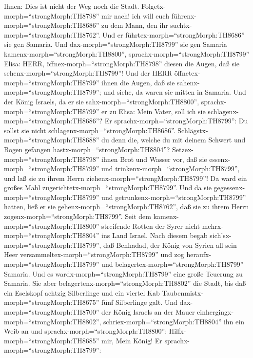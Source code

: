 Ihnen: Dies ist nicht der Weg noch die Stadt.
Folgetx-morph=``strongMorph:TH8798'' mir nach! ich will euch
führenx-morph=``strongMorph:TH8686'' zu dem Mann, den ihr
suchtx-morph=``strongMorph:TH8762''. Und er
führtex-morph=``strongMorph:TH8686'' sie gen Samaria.  Und
dax-morph=``strongMorph:TH8799'' sie gen Samaria
kamenx-morph=``strongMorph:TH8800'',
sprachx-morph=``strongMorph:TH8799'' Elisa: HERR,
öffnex-morph=``strongMorph:TH8798'' diesen die Augen, daß sie
sehenx-morph=``strongMorph:TH8799''! Und der HERR
öffnetex-morph=``strongMorph:TH8799'' ihnen die Augen, daß sie
sahenx-morph=``strongMorph:TH8799''; und siehe, da waren sie mitten in
Samaria.  Und der König Israels, da er sie
sahx-morph=``strongMorph:TH8800'', sprachx-morph=``strongMorph:TH8799''
er zu Elisa: Mein Vater, soll ich sie
schlagenx-morph=``strongMorph:TH8686''?  Er
sprachx-morph=``strongMorph:TH8799'': Du sollst sie nicht
schlagenx-morph=``strongMorph:TH8686''.
Schlägstx-morph=``strongMorph:TH8688'' du denn die, welche du mit deinem
Schwert und Bogen gefangen hastx-morph=``strongMorph:TH8804''?
Setzex-morph=``strongMorph:TH8798'' ihnen Brot und Wasser vor, daß sie
essenx-morph=``strongMorph:TH8799'' und
trinkenx-morph=``strongMorph:TH8799'', und laß sie zu ihrem Herrn
ziehenx-morph=``strongMorph:TH8799''!  Da ward ein großes
Mahl zugerichtetx-morph=``strongMorph:TH8799''. Und da sie
gegessenx-morph=``strongMorph:TH8799'' und
getrunkenx-morph=``strongMorph:TH8799'' hatten, ließ er sie
gehenx-morph=``strongMorph:TH8762'', daß sie zu ihrem Herrn
zogenx-morph=``strongMorph:TH8799''. Seit dem
kamenx-morph=``strongMorph:TH8800'' streifende Rotten der Syrer nicht
mehrx-morph=``strongMorph:TH8804'' ins Land Israel.  Nach
diesem begab sich'sx-morph=``strongMorph:TH8799'', daß Benhadad, der
König von Syrien all sein Heer versammeltex-morph=``strongMorph:TH8799''
und zog heraufx-morph=``strongMorph:TH8799'' und
belagertex-morph=``strongMorph:TH8799'' Samaria.  Und es
wardx-morph=``strongMorph:TH8799'' eine große Teuerung zu Samaria. Sie
aber belagertenx-morph=``strongMorph:TH8802'' die Stadt, bis daß ein
Eselskopf achtzig Silberlinge und ein viertel Kab
Taubenmistx-morph=``strongMorph:TH8675'' fünf Silberlinge galt.
 Und dax-morph=``strongMorph:TH8700'' der König Israels an
der Mauer einhergingx-morph=``strongMorph:TH8802'',
schriex-morph=``strongMorph:TH8804'' ihn ein Weib an und
sprachx-morph=``strongMorph:TH8800'': Hilfx-morph=``strongMorph:TH8685''
mir, Mein König!  Er sprachx-morph=``strongMorph:TH8799'':
